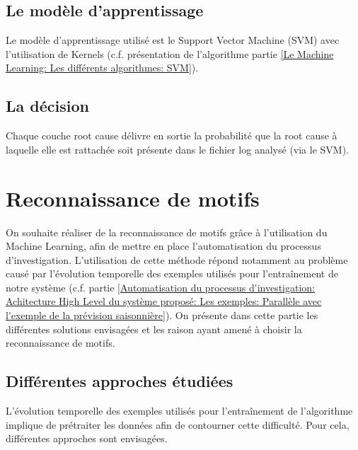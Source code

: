 \subsection{Le modèle d'apprentissage}
\label{Automatisation du processus d'investigation: Achitecture High Level du système proposé: Le modèle d'apprentissage}
Le modèle d'apprentissage utilisé est le Support Vector Machine (SVM) avec l'utilisation de Kernels (c.f. présentation de l'algorithme partie \ref{Le Machine Learning: Les différents algorithmes: SVM}).


\subsection{La décision}
\label{Automatisation du processus d'investigation: Achitecture High Level du système proposé: La décision}
Chaque couche root cause délivre en sortie la probabilité que la root cause à laquelle elle est rattachée soit présente dans le fichier log analysé (via le SVM).



\section{Reconnaissance de motifs}
\label{Automatisation du processus d'investigation: Reconnaissance de motifs}
On souhaite réaliser de la reconnaissance de motifs grâce à l'utilisation du Machine Learning, afin de mettre en place l'automatisation du processus d'investigation. L'utilisation de cette méthode répond notamment au problème causé par l'évolution temporelle des exemples utilisés pour l'entraînement de notre système (c.f. partie \ref{Automatisation du processus d'investigation: Achitecture High Level du système proposé: Les exemples: Parallèle avec l'exemple de la prévision saisonnière}). On présente dans cette partie les différentes solutions envisagées et les raison ayant amené à choisir la reconnaissance de motifs. 

\subsection{Différentes approches étudiées}
\label{Automatisation du processus d'investigation: Reconnaissance de motifs: Différentes approches étudiées}
L'évolution temporelle des exemples utilisés pour l'entraînement de l'algorithme implique de prétraiter les données afin de contourner cette difficulté. Pour cela, différentes approches sont envisagées.

